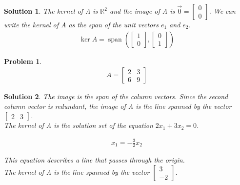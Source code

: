 \documentclass{article}
\newtheorem{problem}{Problem}
\newtheorem*{solution}{Solution}
\DeclareMathOperator{\Span}{span}
\begin{document}
\begin{solution}
The kernel of A is $\mathbb{R}^2$ and the image of A is $\vec{0} = \begin{bmatrix} 0 \\ 0 \end{bmatrix}$. We can write the kernel of A as the span of the unit vectors $e_{1}$ and $e_{2}$.
\begin{align*}
\ker A = \Span \left( \begin{bmatrix}1 \\ 0 \end{bmatrix}, \begin{bmatrix}0 \\ 1 \end{bmatrix} \right)
\end{align*}
\end{solution}

\begin{problem}
\begin{align*}
A = \begin{bmatrix}2 & 3 \\ 6 & 9 \end{bmatrix}
\end{align*}
\end{problem}

\begin{solution}

The image is the span of the column vectors. Since the second column vector is redundant, the image of A is the line spanned by the vector $\begin{bmatrix}2 & 3 \end{bmatrix}$. \\

The kernel of A is the solution set of the equation $2x_{1} + 3x_{2} = 0$.

\begin{align*}
\displaystyle x_{1} = -\frac{3}{2}x_{2}
\end{align*}

This equation describes a line that passes through the origin. \\

The kernel of A is the line spanned by the vector $\begin{bmatrix}3 \\ -2 \end{bmatrix}$.
\end{solution}
\end{document}
